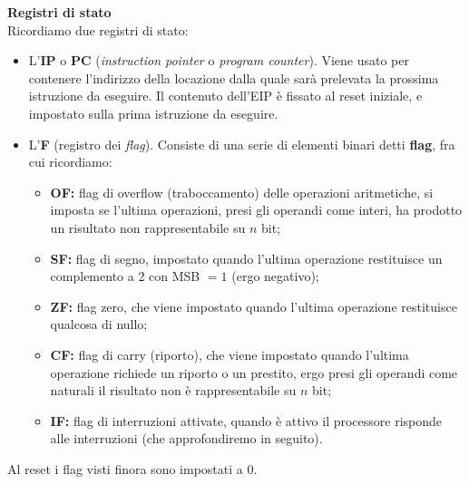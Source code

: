 \documentclass[a4paper,11pt]{article}
\begin{document}
\par\medskip
\textbf{\textsf{Registri di stato}} \\
Ricordiamo due registri di stato:
\begin{itemize}
	\item  L'\textbf{IP} o \textbf{PC} (\textit{instruction pointer} o \textit{program counter}).
Viene usato per contenere l'indirizzo della locazione dalla quale sarà prelevata la prossima istruzione da eseguire.
Il contenuto dell'EIP è fissato al reset iniziale, e impostato sulla prima istruzione da eseguire.

\item L'\textbf{F} (registro dei \textit{flag}).
Consiste di una serie di elementi binari detti \textbf{flag}, fra cui ricordiamo:
\begin{itemize}
	\item \textbf{OF:} flag di overflow (traboccamento) delle operazioni aritmetiche, si imposta se l'ultima operazioni, presi gli operandi come interi, ha prodotto un risultato non rappresentabile su $n$ bit;
	\item \textbf{SF:} flag di segno, impostato quando l'ultima operazione restituisce un complemento a 2 con MSB $= 1$ (ergo negativo);
	\item \textbf{ZF:} flag zero, che viene impostato quando l'ultima operazione restituisce qualcosa di nullo;
	\item \textbf{CF:} flag di carry (riporto), che viene impostato quando l'ultima operazione richiede un riporto o un prestito, ergo presi gli operandi come naturali il risultato non è rappresentabile su $n$ bit;
	\item \textbf{IF:} flag di interruzioni attivate, quando è attivo il processore risponde alle interruzioni (che approfondiremo in seguito). 
\end{itemize}
\end{itemize}

Al reset i flag visti finora sono impostati a 0.
\end{document}
